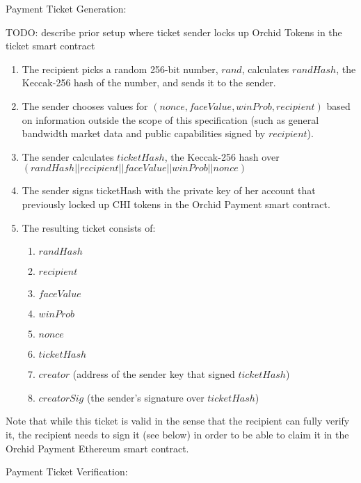 Payment Ticket Generation:

TODO: describe prior setup where ticket sender locks up Orchid Tokens in the ticket smart contract

\begin{enumerate}
\item The recipient picks a random 256-bit number, $rand$, calculates $randHash$, the Keccak-256 hash of the number, and sends it to the sender.
\item The sender chooses values for $(nonce, faceValue, winProb, recipient)$ based on information outside the scope of this specification (such as general bandwidth market data and public capabilities signed by $recipient$).
\item The sender calculates $ticketHash$, the Keccak-256 hash over $(randHash || recipient || faceValue || winProb || nonce)$
\item The sender signs ticketHash with the private key of her account that previously locked up CHI tokens in the Orchid Payment smart contract.
\item The resulting ticket consists of:
\begin{enumerate}
\item $randHash$
\item $recipient$
\item $faceValue$
\item $winProb$
\item $nonce$
\item $ticketHash$
\item $creator$ (address of the sender key that signed $ticketHash$)
\item $creatorSig$ (the sender's signature over $ticketHash$)
 \end{enumerate}
\end{enumerate}

Note that while this ticket is valid in the sense that the recipient can fully verify it, the recipient needs to sign it (see below) in order to be able to claim it in the Orchid Payment Ethereum smart contract.

Payment Ticket Verification:

